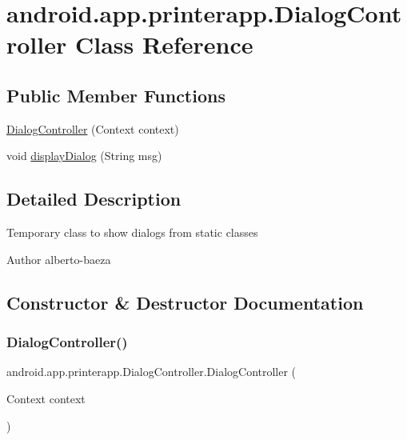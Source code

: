 \hypertarget{classandroid_1_1app_1_1printerapp_1_1_dialog_controller}{}\section{android.\+app.\+printerapp.\+Dialog\+Controller Class Reference}
\label{classandroid_1_1app_1_1printerapp_1_1_dialog_controller}
\subsection*{Public Member Functions}
\begin{DoxyCompactItemize}
\item 
\hyperlink{classandroid_1_1app_1_1printerapp_1_1_dialog_controller_a21babc4485e139578ccb389806e92fd5}{Dialog\+Controller} (Context context)
\item 
void \hyperlink{classandroid_1_1app_1_1printerapp_1_1_dialog_controller_a6a15c5a7684a6512bff4bf8eb23cc373}{display\+Dialog} (String msg)
\end{DoxyCompactItemize}


\subsection{Detailed Description}
Temporary class to show dialogs from static classes \begin{DoxyAuthor}{Author}
alberto-\/baeza 
\end{DoxyAuthor}


\subsection{Constructor \& Destructor Documentation}
\mbox{\label{classandroid_1_1app_1_1printerapp_1_1_dialog_controller_a21babc4485e139578ccb389806e92fd5}} 
\subsubsection{\texorpdfstring{Dialog\+Controller()}{DialogController()}}
{\footnotesize\ttfamily android.\+app.\+printerapp.\+Dialog\+Controller.\+Dialog\+Controller (\begin{DoxyParamCaption}\item[{Context}]{context }\end{DoxyParamCaption})}



